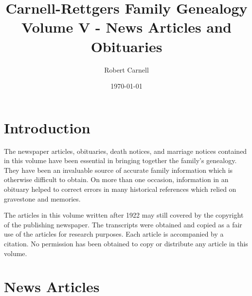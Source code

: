 \documentclass[11pt,letter]{book}
\title{\bf Carnell-Rettgers Family Genealogy \\
       \large Volume V - News Articles and Obituaries}
\author{Robert Carnell}
\date{\today}
\begin{document}
\frontmatter
\maketitle
\tableofcontents
\mainmatter


\chapter{Introduction}

The newspaper articles, obituaries, death notices, and marriage notices contained in this volume have been essential in bringing together the family's genealogy.  They have been an invaluable source of accurate family information which is otherwise difficult to obtain.  On more than one occasion, information in an obituary helped to correct errors in many historical references which relied on gravestone and memories.

The articles in this volume written after 1922 may still covered by the copyright of the publishing newspaper.  The transcripts were obtained and copied as a fair use of the articles for research purposes.  Each article is accompanied by a citation.  No permission has been obtained to copy or distribute any article in this volume.

\chapter{News Articles}
\renewcommand{\thesection}{\arabic{section}}


\end{document}

